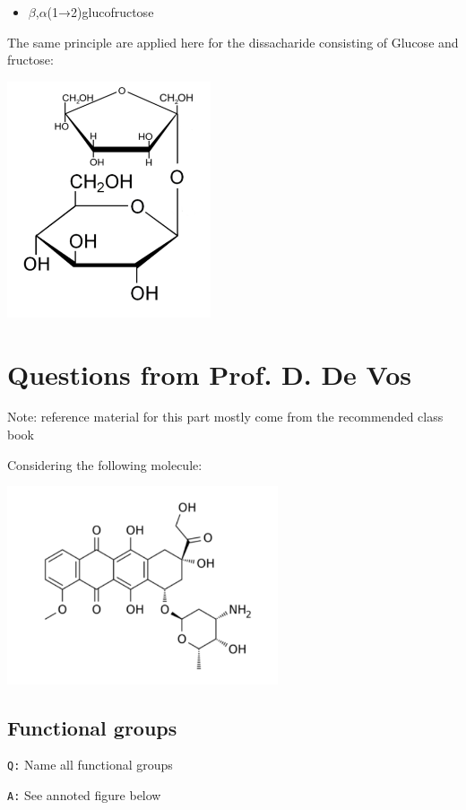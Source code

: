 \documentclass[11pt, a4paper,titlepage]{article}
\begin{document}
\begin{itemize}
\item $\beta$,$\alpha$(1→2)glucofructose
\end{itemize}

The same principle are applied here for the dissacharide consisting
of Glucose and fructose:

\includegraphics[width=6cm]{./Figures/BA(1-2)GlucoFructose2.pdf}
\section{Questions from Prof. D. De Vos}
\label{sec-3}

Note: reference material for this part mostly come from the
recommended class book \cite{BioChemBlei}

Considering the following molecule:

\includegraphics[width=8cm]{./Figures/Part3MoleculeRaw.pdf}
\subsection{Functional groups}
\label{sec-3-1}

\texttt{Q:} Name all functional groups

\texttt{A:} See annoted figure below
\end{document}
